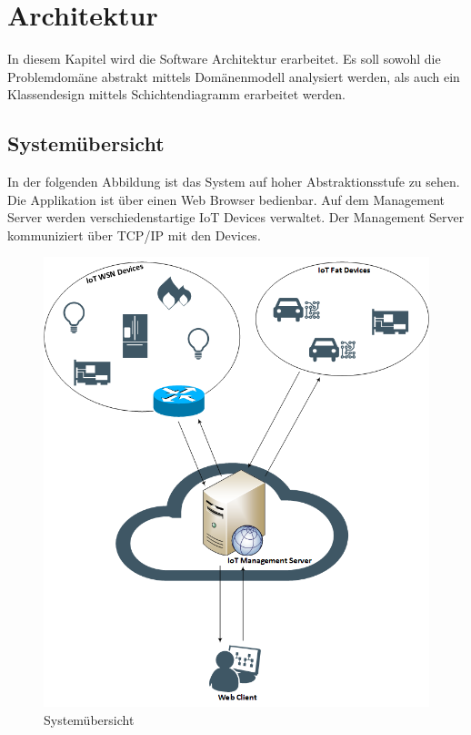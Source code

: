 \chapter{Architektur}
In diesem Kapitel wird die Software Architektur erarbeitet.  
Es soll sowohl die Problemdomäne abstrakt mittels Domänenmodell analysiert werden, als auch ein Klassendesign mittels Schichtendiagramm erarbeitet werden.

\section{Systemübersicht}
In der folgenden Abbildung ist das System auf hoher Abstraktionsstufe zu sehen. Die Applikation ist über einen Web Browser bedienbar. Auf dem Management Server werden verschiedenstartige IoT Devices verwaltet. Der Management Server kommuniziert über TCP/IP mit den Devices. 

\begin{figure}[H]
\center
\includegraphics[scale=0.6]{../03_Design/images/systemuebersicht.png}\caption{Systemübersicht}
\end{figure}

\newpage


